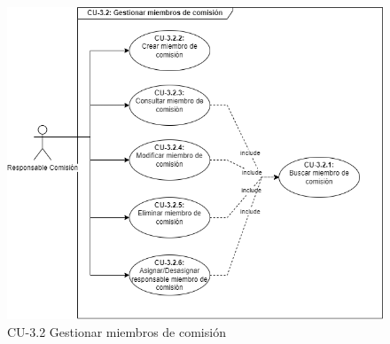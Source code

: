 \begin{figure}[H]
        \centering
        \includegraphics[scale=0.55]{img/diagramas/Funcional/CU-3.2.png}
        \caption{CU-3.2 Gestionar miembros de comisión}
        \label{fig:Diagrama-Caso de uso 3.2 Gestionar miembros de comisión}
    \end{figure}

